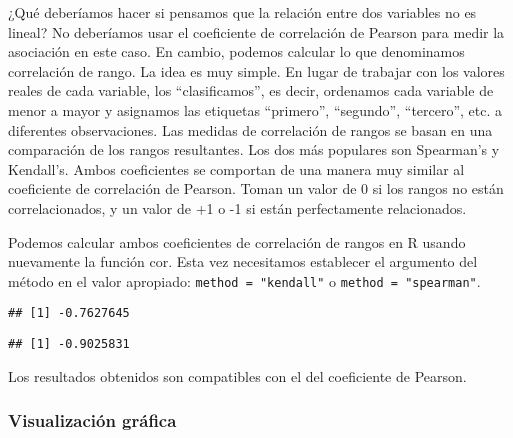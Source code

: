 \documentclass[
]{book}
\newenvironment{Shaded}{\begin{snugshade}}{\end{snugshade}}
\newcommand{\AttributeTok}[1]{\textcolor[rgb]{0.77,0.63,0.00}{#1}}
\newcommand{\FunctionTok}[1]{\textcolor[rgb]{0.00,0.00,0.00}{#1}}
\newcommand{\NormalTok}[1]{#1}
\newcommand{\SpecialCharTok}[1]{\textcolor[rgb]{0.00,0.00,0.00}{#1}}
\newcommand{\StringTok}[1]{\textcolor[rgb]{0.31,0.60,0.02}{#1}}
\begin{document}
¿Qué deberíamos hacer si pensamos que la relación entre dos variables no es lineal? No deberíamos usar el coeficiente de correlación de Pearson para medir la asociación en este caso. En cambio, podemos calcular lo que denominamos correlación de rango. La idea es muy simple. En lugar de trabajar con los valores reales de cada variable, los ``clasificamos'', es decir, ordenamos cada variable de menor a mayor y asignamos las etiquetas ``primero'', ``segundo'', ``tercero'', etc. a diferentes observaciones. Las medidas de correlación de rangos se basan en una comparación de los rangos resultantes. Los dos más populares son Spearman's y Kendall's. Ambos coeficientes se comportan de una manera muy similar al coeficiente de correlación de Pearson. Toman un valor de 0 si los rangos no están correlacionados, y un valor de +1 o -1 si están perfectamente relacionados.

Podemos calcular ambos coeficientes de correlación de rangos en R usando nuevamente la función cor. Esta vez necesitamos establecer el argumento del método en el valor apropiado: \texttt{method\ =\ "kendall"} o \texttt{method\ =\ "spearman"}.

\begin{Shaded}
\end{Shaded}

\begin{verbatim}
## [1] -0.7627645
\end{verbatim}

\begin{Shaded}
\end{Shaded}

\begin{verbatim}
## [1] -0.9025831
\end{verbatim}

Los resultados obtenidos son compatibles con el del coeficiente de Pearson.

\hypertarget{visualizaciuxf3n-gruxe1fica-4}{%
\subsubsection{Visualización gráfica}\label{visualizaciuxf3n-gruxe1fica-4}}
\end{document}
